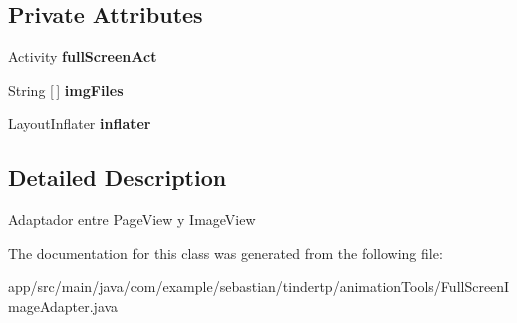 \subsection*{Private Attributes}
\begin{DoxyCompactItemize}
\item 
Activity {\bfseries full\+Screen\+Act}\hypertarget{classcom_1_1example_1_1sebastian_1_1tindertp_1_1animationTools_1_1FullScreenImageAdapter_ad3380703484a7347a0b880e6407fa801}{}\label{classcom_1_1example_1_1sebastian_1_1tindertp_1_1animationTools_1_1FullScreenImageAdapter_ad3380703484a7347a0b880e6407fa801}

\item 
String \mbox{[}$\,$\mbox{]} {\bfseries img\+Files}\hypertarget{classcom_1_1example_1_1sebastian_1_1tindertp_1_1animationTools_1_1FullScreenImageAdapter_aca981e5ced6a1e275d7f66ab972f5834}{}\label{classcom_1_1example_1_1sebastian_1_1tindertp_1_1animationTools_1_1FullScreenImageAdapter_aca981e5ced6a1e275d7f66ab972f5834}

\item 
Layout\+Inflater {\bfseries inflater}\hypertarget{classcom_1_1example_1_1sebastian_1_1tindertp_1_1animationTools_1_1FullScreenImageAdapter_a11b97b26745cd2837216c82d7e7d9b0e}{}\label{classcom_1_1example_1_1sebastian_1_1tindertp_1_1animationTools_1_1FullScreenImageAdapter_a11b97b26745cd2837216c82d7e7d9b0e}

\end{DoxyCompactItemize}


\subsection{Detailed Description}
Adaptador entre Page\+View y Image\+View 

The documentation for this class was generated from the following file\+:\begin{DoxyCompactItemize}
\item 
app/src/main/java/com/example/sebastian/tindertp/animation\+Tools/Full\+Screen\+Image\+Adapter.\+java\end{DoxyCompactItemize}
